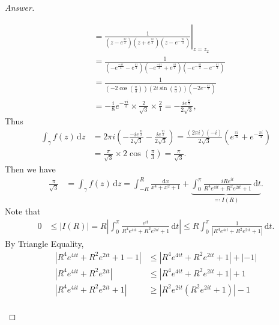 \documentclass[12pt]{article}
\newcommand\paren[1]{\left( #1 \right)}
\theoremstyle{definition}
\begin{document}
\begin{proof}[Answer]
\begin{enumerate}[(i)]
\begin{align*}
            & = \left. \frac{1}{ \paren{ z - e^{\frac{\pi i}{3}} } \paren{ z + e^{\frac{\pi i}{3}} } \paren{ z - e^{-\frac{\pi i}{3}} } } \right|_{z = z_2} \\
            & = \frac{1}{ \paren{ -e^{\frac{-\pi i}{3}} - e^{\frac{\pi i}{3}} } \paren{ -e^{\frac{-\pi i}{3}} + e^{\frac{\pi i}{3}} } \paren{ -e^{-\frac{\pi i}{3}} - e^{-\frac{\pi i}{3}} } } \\
            & = \frac{1}{ \paren{ -2 \cos \paren{ \frac{\pi}{3} } } \paren{ 2i \sin \paren{ \frac{\pi}{3} } } \paren{ -2 e^{-\frac{\pi i}{3} }  } } \\
            & = -\frac{i}{8} e^{-\frac{\pi i}{3}} \times \frac{2}{\sqrt{3}} \times \frac{2}{1} = -\frac{i e^{\frac{\pi i}{3}} }{2\sqrt{3}},
        \end{align*}
        Thus
        \begin{align*}
            \int_{\gamma} f(z) \, \mathrm{d}z & = 2\pi i \paren{ -\frac{-i e^{\frac{\pi i}{3}} }{2\sqrt{3}} -\frac{i e^{\frac{\pi i}{3}} }{2\sqrt{3}} } = \frac{(2\pi i)(-i)}{2\sqrt{3}} \paren{ e^{\frac{\pi i}{3}} + e^{-\frac{\pi i}{3}} } \\
            & = \frac{\pi}{\sqrt{3}} \times 2 \cos \paren{ \frac{\pi}{3} } = \frac{\pi}{\sqrt{3}}.
        \end{align*}
        Then we have 
        \begin{align*}
            \frac{\pi}{\sqrt{3}} & = \int_{\gamma} f(z) \, \mathrm{d}z = \int_{-R}^{R} \frac{\mathrm{d}x}{x^4 + x^2 + 1} + \underbrace{ \int_0^{\pi} \frac{i Re^{it}}{R^4e^{4it} + R^2e^{2it} + 1 } \, \mathrm{d}t }_{ \eqqcolon I(R) }.
        \end{align*}
        Note that 
        \begin{align*}
            0 & \leq |I(R)| = R \left| \int_0^{\pi} \frac{e^{it}}{R^4e^{4it} + R^2e^{2it} + 1 } \, \mathrm{d}t \right| \leq R \int_0^{\pi} \frac{1}{ \left| R^4e^{4it} + R^2e^{2it} + 1 \right| } \, \mathrm{d}t.
        \end{align*}
        By Triangle Equality, 
        \begin{align*}
            \left| R^4e^{4it} + R^2e^{2it} + 1 - 1 \right| & \leq \left| R^4e^{4it} + R^2e^{2it} + 1 \right| + |-1| \\
            \left| R^4e^{4it} + R^2e^{2it} \right| & \leq \left| R^4e^{4it} + R^2e^{2it} + 1 \right| + 1 \\
            \left| R^4e^{4it} + R^2e^{2it} + 1 \right| & \geq \left| R^2 e^{2it} \paren{ R^2 e^{2it} + 1 } \right| - 1 \\

\end{align*}
\end{enumerate}
\end{proof}
\end{document}
